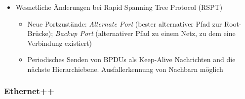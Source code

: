 \begin{itemize}
\begin{itemize}
\begin{itemize}
			\item Wesnetliche Änderungen bei Rapid Spanning Tree Protocol (RSPT)
			\begin{itemize}
				\item Neue Portzustände: \textit{Alternate Port} (bester alternativer Pfad zur Root-Brücke); \textit{Backup Port} (alternativer Pfad zu einem Netz, zu dem eine Verbindung existiert)
				\item Periodisches Senden von BPDUs als Keep-Alive Nachrichten and die nächste Hierarchiebene. Ausfallerkennung von Nachbarn möglich
			\end{itemize}
		\end{itemize}
	\end{itemize}
\end{itemize}

\subsubsection{Ethernet++}
